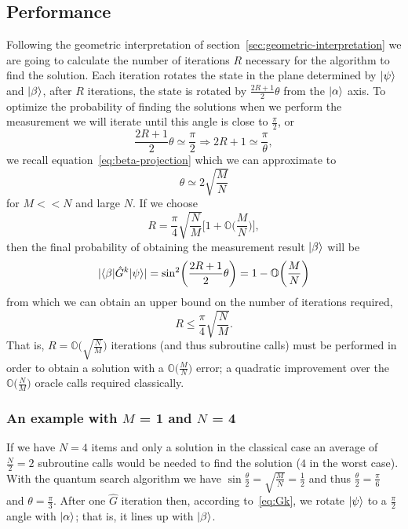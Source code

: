 \subsection{Performance}\label{sec:performance}
Following the geometric interpretation of section~\ref{sec:geometric-interpretation} we are going to calculate the number of iterations $R$ necessary for the algorithm to find the solution. Each iteration rotates the state in the plane determined by $\ket{\psi}$ and $\ket{\beta}$, after $R$ iterations, the state is rotated by $\frac{2R + 1}{2}\theta$ from the $\ket{\alpha}$ axis. To optimize the probability of finding the solutions when we perform the measurement we will iterate until this angle is close to $\frac{\pi}{2}$, or
\begin{equation*}
    \frac{2R + 1}{2}\theta \simeq \frac{\pi}{2} \Rightarrow 2R + 1 \simeq \frac{\pi}{\theta},
\end{equation*}
we recall equation~\ref{eq:beta-projection} which we can approximate to
\begin{equation*}
    \theta \simeq 2\sqrt{\frac{M}{N}}
\end{equation*}
for $M<<N$ and large $N$. If we choose
\begin{equation*}
    R = \frac{\pi}{4}\sqrt{\frac{N}{M}} \biggl[1+\mathbb{O}\biggl(\frac{M}{N}\biggr)\biggr],
\end{equation*}
then the final probability of obtaining the measurement result $\ket{\beta}$ will be
\begin{equation*}
    \lvert\braket{\beta | \hat{G}^k | \psi}\rvert = \sin^2\biggl(\frac{2R + 1}{2}\theta\biggr) = 1 - \mathbb{O}\biggl(\frac{M}{N}\biggl)
\end{equation*}
from which we can obtain an upper bound on the number of iterations required,
\begin{equation}\label{eq:upper-bound}
    R \leq \frac{\pi}{4} \sqrt{\frac{N}{M}}.
\end{equation}
That is, $R = \mathbb{O}\bigl(\sqrt{\frac{N}{M}}\bigr)$ iterations (and thus subroutine calls) must be performed in order to obtain a solution with a $\mathbb{O}\bigl(\frac{M}{N}\bigr)$ error; a quadratic improvement over the $\mathbb{O}\bigl(\frac{N}{M}\bigr)$ oracle calls required classically.

\subsubsection{An example with $M$ = 1 and $N$ = 4}
If we have $N = 4$ items and only a solution in the classical case an average of $\frac{N}{2} = 2$ subroutine calls would be needed to find the solution ($4$ in the worst case).
With the quantum search algorithm we have $\sin{\frac{\theta}{2}} = \sqrt{\frac{M}{N}} = \frac{1}{2}$ and thus $\frac{\theta}{2} = \frac{\pi}{6}$ and $\theta = \frac{\pi}{3}$. After one $\hat{G}$ iteration then, according to~\ref{eq:Gk}, we rotate $\ket{\psi}$ to a $\frac{\pi}{2}$ angle with $\ket{\alpha}$; that is, it lines up with $\ket{\beta}$.

